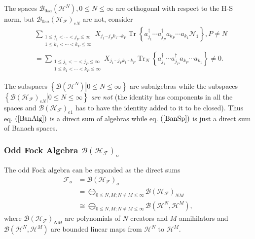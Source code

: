 \documentclass[aps,preprint]{revtex4}%
\begin{document}
The spaces $\mathcal{B}_{0sa}\left(  \mathcal{H}^{N}\right)  ,0\leq
N\leq\infty$ are orthogonal with respect to the H-S norm, but $\mathcal{B}%
_{0sa}\left(  \mathcal{H}_{\mathcal{F}}\right)  _{eN}$ are not, consider%
\begin{align}
&  \sum_{\substack{1\leq j_{1}<\cdots<j_{P}\leq\infty\\1\leq k_{1}%
<\cdots<k_{P}\leq\infty}}X_{j_{1}\cdots j_{P}k_{1}\cdots k_{P}}%
\operatorname*{Tr}\left\{  a_{j_{1}}^{\dagger}\cdots a_{j_{P}}^{\dagger
}a_{k_{P}}\cdots a_{k_{1}}\mathcal{N}_{1}\right\}  ,P\neq N\nonumber\\
&  =\sum_{\substack{1\leq j_{1}<\cdots<j_{P}\leq\infty\\1\leq k_{1}%
<\cdots<k_{P}\leq\infty}}X_{j_{1}\cdots j_{P}k_{1}\cdots k_{P}}%
\operatorname*{Tr}\nolimits_{N}\left\{  a_{j_{1}}^{\dagger}\cdots a_{j_{P}%
}^{\dagger}a_{k_{P}}\cdots a_{k_{1}}\right\}  \neq0.
\end{align}


The subspaces $\left\{  \left.  \mathcal{B}\left(  \mathcal{H}^{N}\right)
\right\vert 0\leq N\leq\infty\right\}  $ are subalgebras while the subspaces
$\left\{  \left.  \mathcal{B}\left(  \mathcal{H}_{\mathcal{F}}\right)
_{eN}\right\vert 0\leq N\leq\infty\right\}  $ \emph{are not }(the identity has
components in all the spaces and $\mathcal{B}\left(  \mathcal{H}_{\mathcal{F}%
}\right)  _{e1}$ has to have the identity added to it to be closed). Thus eq.
$\left(  \ref{BanAlg}\right)  $ is a direct sum of algebras while eq. $\left(
\ref{BanSp}\right)  $ is just a direct sum of Banach spaces.

\subsubsection{Odd Fock Algebra $\mathcal{B}\left(  \mathcal{H}_{\mathcal{F}%
}\right)  _{o}$}

The odd Fock algebra can be expanded as the direct sums
\begin{align}
\mathcal{F}_{o}  &  =\mathcal{B}\left(  \mathcal{H}_{\mathcal{F}}\right)
_{o}\nonumber\\
&  =%
{\displaystyle\bigoplus\limits_{0\leq N,M;N\neq M\leq\infty}}
\mathcal{B}\left(  \mathcal{H}_{\mathcal{F}}\right)  _{NM}\\
&  \cong%
{\displaystyle\bigoplus\limits_{0\leq N,M;N\neq M\leq\infty}}
\mathcal{B}\left(  \mathcal{H}^{N},\mathcal{H}^{M}\right)  ,
\end{align}
where $\mathcal{B}\left(  \mathcal{H}_{\mathcal{F}}\right)  _{NM}$ are
polynomials of $N$ creators and $M$ annihilators and $\mathcal{B}\left(
\mathcal{H}^{N},\mathcal{H}^{M}\right)  $ are bounded linear maps from
$\mathcal{H}^{N}$ to $\mathcal{H}^{M}.$
\end{document}
